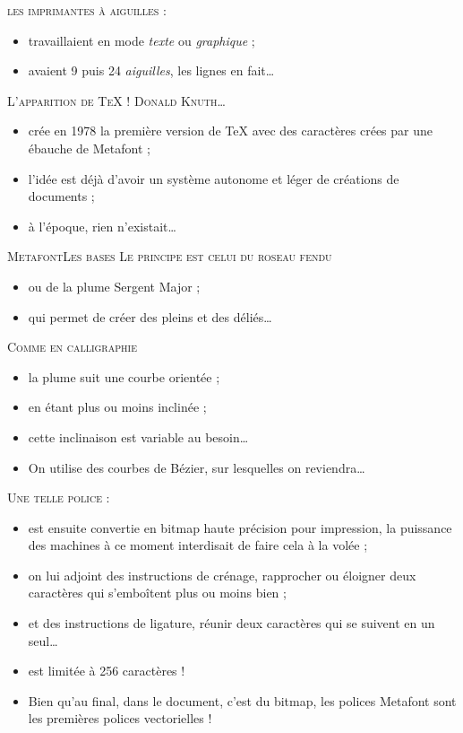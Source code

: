 \documentclass[12pt,a4paper,twocolumn]{book} %
\begin{document}
		{\textsc{les imprimantes à aiguilles :}}
		\begin{itemize}
			\item<+-> travaillaient en mode \textit{texte} ou \textit{graphique} ;
			\item<+-> avaient 9 puis 24 \textit{aiguilles}, les lignes en fait\dots
		\end{itemize}
	{\textsc{L'apparition de TeX !}
	 {\textsc{Donald \textsc{Knuth}\dots}}
		\begin{itemize}
			\item<+-> crée en 1978 la première version de TeX avec des caractères crées par une ébauche de Metafont ;
			\item<+-> l'idée est déjà d'avoir un système autonome et léger de créations de documents ;
			\item<+-> à l'époque, rien n'existait\dots
		\end{itemize}	
	{\textsc{MetafontLes bases}
	{\textsc{Le principe est celui du roseau fendu}}
		\begin{itemize}
			\item<+-> ou de la plume Sergent Major ;
			\item<+-> qui permet de créer des pleins et des déliés\dots
		\end{itemize}	
		
	{\textsc{Comme en calligraphie}}
		\begin{itemize}
			\item<+-> la plume suit une courbe orientée ;
			\item<+-> en étant plus ou moins inclinée ;
			\item<+-> cette inclinaison est variable au besoin\dots
			\item<+-> On utilise des courbes de Bézier, sur lesquelles on reviendra\dots
		\end{itemize}	

{\textsc{Une telle police :}}
		\begin{itemize}
			\item<+-> est ensuite convertie en bitmap haute précision pour impression,
				la puissance des machines à ce moment interdisait de faire cela à la volée ;
			\item<+-> on lui adjoint des instructions de crénage, rapprocher ou éloigner deux caractères
				qui s'emboîtent plus ou moins bien ;
			\item<+-> et des instructions de ligature, réunir deux caractères qui se suivent en un seul\dots
			\item<+-> est limitée à 256 caractères !
			\item<+-> Bien qu'au final, dans le document, c'est du bitmap, les polices Metafont sont les premières polices vectorielles !
			\end{itemize}	
			
}}
\end{document}
